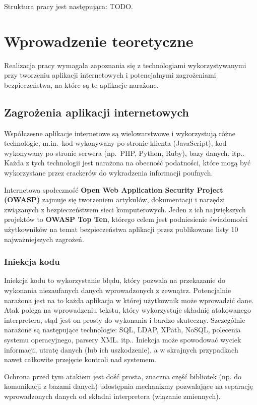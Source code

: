 \documentclass[11pt,a4paper,polish,thesis,oneside]{dcsbook}
\begin{document}
Struktura pracy jest następująca: TODO.


\chapter{Wprowadzenie teoretyczne}
Realizacja pracy wymagała zapoznania się z technologiami wykorzystywanymi przy tworzeniu aplikacji internetowych i potencjalnymi zagrożeniami bezpieczeństwa, na które są te aplikacje narażone.
\section{Zagrożenia aplikacji internetowych}
Współczesne aplikacje internetowe są wielowarstwowe i wykorzystują różne technologie, m.in.~kod wykonywany po stronie klienta (JavaScript), kod wykonywany po stronie serwera (np.~PHP, Python, Ruby), bazy danych, itp.. Każda z tych technologii jest narażona na obecność podatności, które mogą być wykorzystane przez crackerów do wykradzenia informacji poufnych.

Internetowa społeczność \textbf{Open Web Application Security Project (OWASP)}\cite{owasp} zajmuje się tworzeniem artykułów, dokumentacji i narzędzi związanych z bezpieczeństwem sieci komputerowych. Jeden z ich największych projektów to \textbf{OWASP Top Ten}, którego celem jest podniesienie świadomości użytkowników na temat bezpieczeństwa aplikacji przez publikowane listy 10 najważniejszych zagrożeń.

\subsection{Iniekcja kodu}
Iniekcja kodu to wykorzystanie błędu, który pozwala na przekazanie do wykonania niezaufanych danych wprowadzonych z zewnątrz. Potencjalnie narażona jest na to każda aplikacja w której użytkownik może wprowadzić dane. Atak polega na wprowadzeniu tekstu, który wykorzystuje składnię atakowanego interpretera, stąd jest on prosty do wykonania i bardzo skuteczny. Szczególnie narażone są następujące technologie: SQL, LDAP, XPath, NoSQL, polecenia systemu operacyjnego, parsery XML. itp.. Iniekcja może spowodować wyciek informacji, utratę danych (lub ich uszkodzenie), a w skrajnych przypadkach nawet całkowite przejęcie kontroli nad systemem.

Ochrona przed tym atakiem jest dość prosta, znaczna część bibliotek (np. do komunikacji z bazami danych) udostępnia mechanizmy pozwalające na separację wprowadzonych danych od składni interpretera (wiązanie zmiennych).
\end{document}
